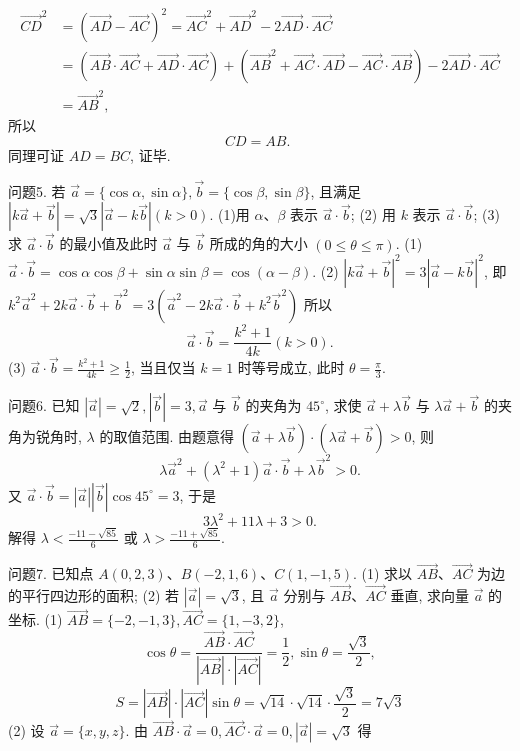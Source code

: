 $$
\begin{aligned}
\overrightarrow{C D}^2 & =(\overrightarrow{A D}-\overrightarrow{A C})^2=\overrightarrow{A C}^2+\overrightarrow{A D}^2-2 \overrightarrow{A D} \cdot \overrightarrow{A C} \\
& =(\overrightarrow{A B} \cdot \overrightarrow{A C}+\overrightarrow{A D} \cdot \overrightarrow{A C})+\left(\overrightarrow{A B}^2+\overrightarrow{A C} \cdot \overrightarrow{A D}-\overrightarrow{A C} \cdot \overrightarrow{A B}\right)-2 \overrightarrow{A D} \cdot \overrightarrow{A C} \\
& =\overrightarrow{A B}^2,
\end{aligned}
$$
所以
$$
C D=A B \text {. }
$$
同理可证 $A D=B C$, 证毕.



问题5. 若 $\vec{a}=\{\cos \alpha, \sin \alpha\}, \vec{b}=\{\cos \beta, \sin \beta\}$, 且满足 $|k \vec{a}+\vec{b}|=\sqrt{3}|\vec{a}-k \vec{b}|(k>0)$.
(1)用 $\alpha 、 \beta$ 表示 $\vec{a} \cdot \vec{b}$;
(2) 用 $k$ 表示 $\vec{a} \cdot \vec{b}$;
(3) 求 $\vec{a} \cdot \vec{b}$ 的最小值及此时 $\vec{a}$ 与 $\vec{b}$ 所成的角的大小 $(0 \leqslant \theta \leqslant \pi)$.
(1) $\vec{a} \cdot \vec{b}=\cos \alpha \cos \beta+\sin \alpha \sin \beta=\cos (\alpha-\beta)$.
(2) $|k \vec{a}+\vec{b}|^2=3|\vec{a}-k \vec{b}|^2$, 即 $k^2 \vec{a}^2+2 k \vec{a} \cdot \vec{b}+\vec{b}^2=3\left(\vec{a}^2-2 k \vec{a} \cdot \vec{b}+k^2 \vec{b}^2\right)$
所以
$$
\vec{a} \cdot \vec{b}=\frac{k^2+1}{4 k}(k>0) .
$$
(3) $\vec{a} \cdot \vec{b}=\frac{k^2+1}{4 k} \geqslant \frac{1}{2}$, 当且仅当 $k=1$ 时等号成立, 此时 $\theta=\frac{\pi}{3}$.



问题6. 已知 $|\vec{a}|=\sqrt{2},|\vec{b}|=3, \vec{a}$ 与 $\vec{b}$ 的夹角为 $45^{\circ}$, 求使 $\vec{a}+\lambda \vec{b}$ 与 $\lambda \vec{a}+\vec{b}$ 的夹角为锐角时, $\lambda$ 的取值范围.
由题意得 $(\vec{a}+\lambda \vec{b}) \cdot(\lambda \vec{a}+\vec{b})>0$, 则
$$
\lambda \vec{a}^2+\left(\lambda^2+1\right) \vec{a} \cdot \vec{b}+\lambda \vec{b}^2>0 .
$$
又 $\vec{a} \cdot \vec{b}=|\vec{a}||\vec{b}| \cos 45^{\circ}=3$, 于是
$$
3 \lambda^2+11 \lambda+3>0 .
$$
解得 $\lambda<\frac{-11-\sqrt{85}}{6}$ 或 $\lambda>\frac{-11+\sqrt{85}}{6}$.



问题7. 已知点 $A(0,2,3) 、 B(-2,1,6) 、 C(1,-1,5)$.
(1) 求以 $\overrightarrow{A B} 、 \overrightarrow{A C}$ 为边的平行四边形的面积;
(2) 若 $|\vec{a}|=\sqrt{3}$, 且 $\vec{a}$ 分别与 $\overrightarrow{A B} 、 \overrightarrow{A C}$ 垂直, 求向量 $\vec{a}$ 的坐标.
(1) $\overrightarrow{A B}=\{-2,-1,3\}, \overrightarrow{A C}=\{1,-3,2\}$,
$$
\cos \theta=\frac{\overrightarrow{A B} \cdot \overrightarrow{A C}}{|\overrightarrow{A B}| \cdot|\overrightarrow{A C}|}=\frac{1}{2}, \sin \theta=\frac{\sqrt{3}}{2},
$$
$$
S=|\overrightarrow{A B}| \cdot|\overrightarrow{A C}| \sin \theta=\sqrt{14} \cdot \sqrt{14} \cdot \frac{\sqrt{3}}{2}=7 \sqrt{3}
$$
(2) 设 $\vec{a}=\{x, y, z\}$. 由 $\overrightarrow{A B} \cdot \vec{a}=0, \overrightarrow{A C} \cdot \vec{a}=0,|\vec{a}|=\sqrt{3}$ 得



